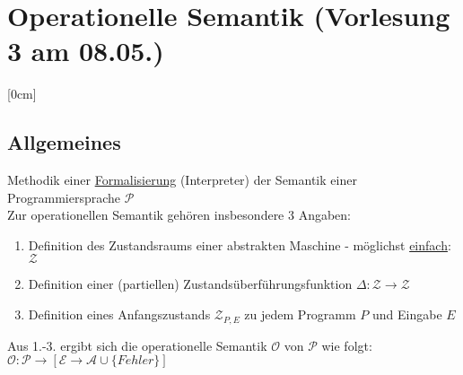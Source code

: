 \section{Operationelle Semantik \small(Vorlesung 3 am 08.05.)}
[0cm]
\subsection{Allgemeines}
Methodik einer \underline{Formalisierung} (Interpreter) der Semantik einer Programmiersprache $\mathcal{P}$\\
Zur operationellen Semantik gehören insbesondere 3 Angaben:
\begin{enumerate}
	\item Definition des Zustandsraums einer abstrakten Maschine - möglichst \underline{einfach}: $\mathcal{Z}$
	\item Definition einer (partiellen) Zustandsüberführungsfunktion $\Delta:\mathcal{Z}\rightarrow \mathcal{Z}$
	\item Definition eines Anfangszustands $\mathcal{Z}_{P,E}$ zu jedem Programm $P$ und Eingabe $E$
\end{enumerate}
Aus 1.-3. ergibt sich die operationelle Semantik $\mathcal{O}$  von $\mathcal{P}$ wie folgt:\\
$\mathcal{O}:\mathcal{P}\rightarrow[\mathcal{E}\rightarrow \mathcal{A}\cup \{Fehler\}]$\\


